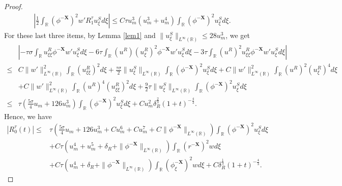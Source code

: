 \documentclass[10pt,a4paper]{amsart}
\begin{document}
\begin{proof}
\begin{align*}
			\left|\frac{1}{2}\int_{\mathbb{R}}(\phi^{-\mathbf{X}})^{2}w'R_{1}^{\tau}u_{\xi}^{S}d\xi\right|\leq C\tau u_m^3\left(u_m^3+u_m^4\right)\int_{\mathbb{R}}(\phi^{-\mathbf{X}})^2u^S_{\xi}d\xi.
		\end{align*}
		For these last three items, by Lemma \ref{lem1} and $\|u^S_{\xi}\|_{L^{\infty}(\mathbb{R})}\leq 28u_m^3$, we get
		\begin{align*}
			&\left|-\tau\sigma\int_{\mathbb{R}}u_{\xi\xi}^R\phi^{-\mathbf{X}}w'u_{\xi}^Sd\xi-6\tau\int_{\mathbb{R}}(u^{R})(u_{\xi}^{R})^{2}\phi^{-\mathbf{X}}w'u_{\xi}^{S}d\xi-3\tau\int_{\mathbb{R}}(u^{R})^{2}u_{\xi\xi}^{R}\phi^{-\mathbf{X}}w'u_{\xi}^{S}d\xi\right|\\
			\leq&C \|w'\|_{L^{\infty}(\mathbb{R})}^2\int_{\mathbb{R}}(u^R_{\xi\xi})^2d\xi+\frac{\tau\sigma}{2} \|u^{S}_{\xi}\|_{L^{\infty}(\mathbb{R})}\int_{\mathbb{R}}(\phi^{-\mathbf{X}})^2u^S_{\xi}d\xi+C\|w'\|_{L^{\infty}(\mathbb{R})}^2\int_{\mathbb{R}}(u^{R})^2(u^R_{\xi})^{4}d\xi\\
			&+C\|w'\|_{L^{\infty}(\mathbb{R})}^2\int_{\mathbb{R}}(u^R)^4(u^R_{\xi\xi})^2d\xi+\frac{9}{2}\tau \|u^S_{\xi}\|_{L^{\infty}(\mathbb{R})}\int_{\mathbb{R}}(\phi^{-\mathbf{X}})^2u^S_{\xi}d\xi\\
			\leq&\tau\left(\frac{5\sigma}{4}u_m+126u_m^3\right)\int_{\mathbb{R}}(\phi^{-\mathbf{X}})^2u^S_{\xi}d\xi+Cu_m^2\delta_R^{\frac{2}{3}}(1+t)^{-\frac{4}{3}}.
		\end{align*}
		Hence, we have
		\begin{equation}\label{N15}
			\begin{aligned}
				\left|R_0^{\tau}(t)\right|
				\leq&\tau(\frac{5\sigma}{4}u_m+126u_m^3+C u_m^{6}+Cu_m^7+C\|\phi^{-\mathbf{X}}\|_{L^{\infty}(\mathbb{R})})\int_{\mathbb{R}}(\phi^{-\mathbf{X}})^2u_{\xi}^Sd\xi\\
				&+C\tau\left(u_m^4+ u_m^5+\delta_R+\|\phi^{-\mathbf{X}}\|_{L^{\infty}(\mathbb{R})}\right)\int_{\mathbb{R}}(r^{-\mathbf{X}})^2wd\xi\\
				&+C\tau\left(u_m^4+\delta_R+\|\phi^{-\mathbf{X}}\|_{L^{\infty}(\mathbb{R})}\right)\int_{\mathbb{R}}(\phi_{\xi}^{-\mathbf{X}})^2wd\xi+C\delta_R^{\frac{1}{3}}(1+t)^{-\frac{4}{3}}.
			\end{aligned}
		\end{equation}
	\end{proof}
\end{document}
